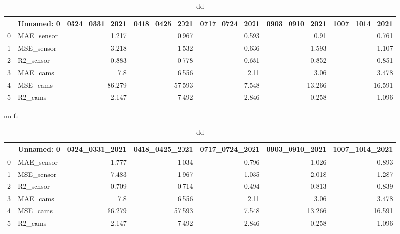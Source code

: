 \begin{table}[H]
\begin{tabular}{rlrrrrr}
\hline
    & Unnamed: 0   &   0324\_0331\_2021 &   0418\_0425\_2021 &   0717\_0724\_2021 &   0903\_0910\_2021 &   1007\_1014\_2021 \\
\hline
  0 & MAE\_sensor   &            1.217 &            0.967 &            0.593 &            0.91  &            0.761 \\
  1 & MSE\_sensor   &            3.218 &            1.532 &            0.636 &            1.593 &            1.107 \\
  2 & R2\_sensor    &            0.883 &            0.778 &            0.681 &            0.852 &            0.851 \\
  3 & MAE\_cams     &            7.8   &            6.556 &            2.11  &            3.06  &            3.478 \\
  4 & MSE\_cams     &           86.279 &           57.593 &            7.548 &           13.266 &           16.591 \\
  5 & R2\_cams      &           -2.147 &           -7.492 &           -2.846 &           -0.258 &           -1.096 \\
\hline
\end{tabular}

no fs

\begin{tabular}{rlrrrrr}
\hline
    & Unnamed: 0   &   0324\_0331\_2021 &   0418\_0425\_2021 &   0717\_0724\_2021 &   0903\_0910\_2021 &   1007\_1014\_2021 \\
\hline
  0 & MAE\_sensor   &            1.777 &            1.034 &            0.796 &            1.026 &            0.893 \\
  1 & MSE\_sensor   &            7.483 &            1.967 &            1.035 &            2.018 &            1.287 \\
  2 & R2\_sensor    &            0.709 &            0.714 &            0.494 &            0.813 &            0.839 \\
  3 & MAE\_cams     &            7.8   &            6.556 &            2.11  &            3.06  &            3.478 \\
  4 & MSE\_cams     &           86.279 &           57.593 &            7.548 &           13.266 &           16.591 \\
  5 & R2\_cams      &           -2.147 &           -7.492 &           -2.846 &           -0.258 &           -1.096 \\
\hline
\end{tabular}
\caption{dd}
\end{table}

